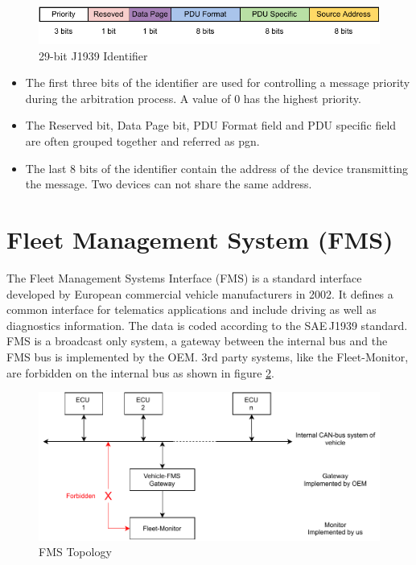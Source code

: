 \begin{figure}[h!]
	\centering
	\includegraphics[width=\textwidth]{images/j1939-identifier}
	\caption{29-bit J1939 Identifier}
	\label{fig:29-bit_J1939_Identifier}
\end{figure}
\begin{itemize}
	\item The first three bits of the identifier are used for controlling a message priority during the arbitration process. A value of 0 has the highest priority.
	\item The Reserved bit, Data Page bit, PDU Format field and PDU specific field are often grouped together and referred as \acrfull{pgn}. 
	\item The last 8 bits of the identifier contain the address of the device transmitting the message. Two devices can not share the same address.
\end{itemize}
\newpage

\section{Fleet Management System (FMS)} \label{Fleet Management System (FMS)}
The Fleet Management Systems Interface (FMS) is a standard interface developed by European commercial vehicle manufacturers in 2002. It defines a common interface for telematics applications and include driving as well as diagnostics information. The data is coded according to the SAE\,J1939 standard. FMS is a broadcast only system, a gateway between the internal bus and the FMS bus is implemented by the OEM. 3rd party systems, like the Fleet-Monitor, are forbidden on the internal bus as shown in figure \ref{fig:fms-bus}. 

\begin{figure}[h!]
	\centering
	\hfuzz=14.0pt
	\includegraphics[width=\textwidth]{images/fms-bus}
	\caption{FMS Topology}
	\label{fig:fms-bus}
\end{figure}

